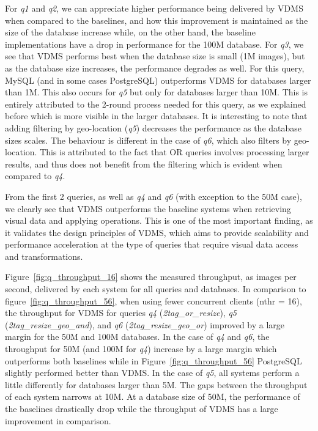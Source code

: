 For \textit{q1} and \textit{q2}, we can appreciate higher performance being delivered by
VDMS when compared to the baselines, and how this improvement is maintained
as the size of the database increase while,
on the other hand, the baseline implementations have a drop in performance
for the 100M database.
For \textit{q3}, we see that VDMS performs best when the database size
is small (1M images), but as the database size increases,
the performance degrades as well.
For this query, MySQL (and in some cases PostgreSQL) outperforms VDMS
for databases larger than 1M.
This also occurs for \textit{q5} but only for databases larger than 10M.
This is entirely attributed to the 2-round process needed for this query,
as we explained before which is more visible in the larger databases.
It is interesting to note that adding filtering by geo-location
(\textit{q5}) decreases the performance as the database sizes scales.
The behaviour is different in the case of \textit{q6},
which also filters by geo-location.
This is attributed to the fact that OR queries involves processing
larger results, and thus does not benefit from the filtering
which is evident when compared to \textit{q4}.

From the first 2 queries, as well as \textit{q4} and
\textit{q6} (with exception to the 50M case),
we clearly see that VDMS outperforms the baseline systems
when retrieving visual data and applying operations.
This is one of the most important finding, as it validates the design principles
of VDMS, which aims to provide scalability and performance acceleration
at the type of queries that require visual data access and transformations.

Figure~\ref{fig:q_throughput_16} shows the measured throughput,
as images per second, delivered by each system for all queries and databases.
In comparison to figure~\ref{fig:q_throughput_56},
when using fewer concurrent clients (nthr = 16),
the throughput for VDMS for queries \textit{q4} (\textit{2tag\_or\_resize}),
\textit{q5} (\textit{2tag\_resize\_geo\_and}), and
\textit{q6} (\textit{2tag\_resize\_geo\_or}) improved by a large margin
for the 50M and 100M databases.
In the case of \textit{q4} and \textit{q6},
the throughput for 50M (and 100M for \textit{q4})
increase by a large margin which outperforms both baselines while in
Figure~\ref{fig:q_throughput_56} PostgreSQL slightly performed better than VDMS.
In the case of \textit{q5}, all systems perform a little differently for databases
larger than 5M.
The gaps between the throughput of each system narrows at 10M.
At a database size of 50M, the performance of the baselines drastically drop
while the throughput of VDMS has a large improvement in comparison.

